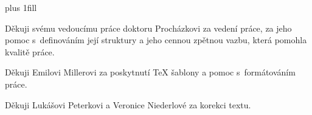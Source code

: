 \vglue 0pt plus 1fill

Děkuji svému vedoucímu práce doktoru Procházkovi za vedení práce, za jeho pomoc s~definováním její struktury a jeho cennou zpětnou vazbu, která pomohla kvalitě práce.

Děkuji Emilovi Millerovi za poskytnutí TeX šablony a pomoc s~formátováním práce.

Děkuji Lukášovi Peterkovi a Veronice Niederlové za korekci textu.


\vspace{20mm}
\newpage

